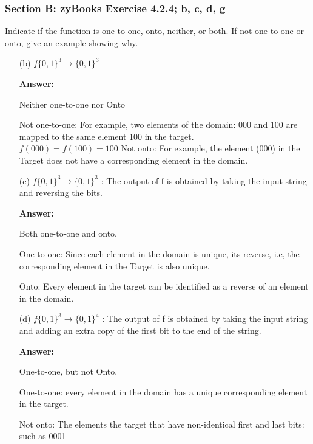\documentclass[14pt]{extreport}
\newcommand{\answer}[0]{\medskip \textbf{Answer:} \medskip}
\begin{document}
\subsubsection*{Section B: zyBooks Exercise 4.2.4; b, c, d, g}

Indicate if the function is one-to-one, onto, neither, or both. If not one-to-one or onto, give an example showing why.
    
\begin{enumerate}
    
    \item[(b)] $f\{0,1\}^{3} \to \{0,1\}^{3}$
    
        \answer

        Neither one-to-one nor Onto
        
        Not one-to-one: For example, two elements of the domain: 000 and 100 are mapped to the same element 100 in the target. \\
        $f\left(000\right) = f\left(100\right) = 100$
        \newline
        Not onto: For example, the element (000) in the Target does not have a corresponding element in the domain.
        \newline

    \item[(c)] $f\{0,1\}^{3} \to \{0,1\}^{3}$ : The output of f is obtained by taking the input string and reversing the bits.
    
        \answer

        Both one-to-one and onto.
        
        One-to-one: Since each element in the domain is unique, its reverse, i.e, the corresponding element in the Target is also unique.   
        
        Onto: Every element in the target can be identified as a reverse of an element in the domain.  
        \newline

    \item[(d)] $f\{0,1\}^{3} \to \{0,1\}^{4}$ : The output of f is obtained by taking the input string and adding an extra copy of the first bit to the end of the string.
    
        \answer

        One-to-one, but not Onto. 
        
        One-to-one: every element in the domain has a unique corresponding element in the target. 
        
        Not onto: The elements the target that have non-identical first and last bits: such as 0001
        \newpage
        

\end{enumerate}
\end{document}
